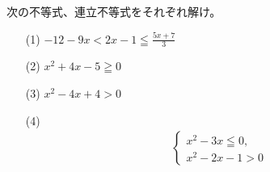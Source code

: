 \documentclass[8pt,dvipdfmx]{article}
\begin{document}
\begin{tcolorbox}[title=数学\textcircled{1} 2-1 A]
次の不等式、連立不等式をそれぞれ解け。
\begin{enumerate}
\item[(1)] $-12-9x < 2x-1 \leqq \frac{5x+7}{3}$

\vspace{2mm} %
\item[(2)] $x^2 + 4x - 5 \geqq 0$

\vspace{2mm} %
\item[(3)] $x^2 - 4x + 4 > 0$
\vspace{2mm} %
\item[(4)]
\begin{align*}
\begin{cases}
x^2 -3x \leqq 0 ,\\
x^2 -2x -1 > 0
\end{cases}
\end{align*}
\end{enumerate}
\end{tcolorbox}



\end{document}
